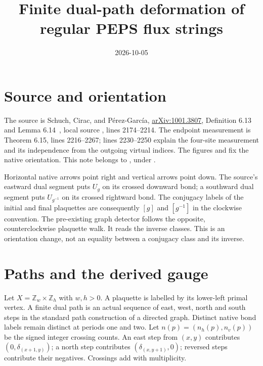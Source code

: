 \documentclass{article}
\title{Finite dual-path deformation of regular PEPS flux strings}
\author{}
\date{2026-10-05}
\begin{document}
\maketitle
{}

\section{Source and orientation}
The source is Schuch, Cirac, and P\'erez-Garc\'ia,
\href{https://arxiv.org/abs/1001.3807}{arXiv:1001.3807},
Definition 6.13 and Lemma 6.14~\cite{Schuch2010PEPS}, local source
, lines 2174--2214.
The endpoint measurement is Theorem 6.15, lines 2216--2267;
lines 2230--2250 explain the four-site measurement and its independence
from the outgoing virtual indices. The figures
 and
 fix the native orientation.
This note belongs to , under .

Horizontal native arrows point right and vertical arrows point down.
The source's eastward dual segment puts $U_g$ on its crossed downward
bond; a southward dual segment puts $U_{g^{-1}}$ on its crossed
rightward bond. The conjugacy labels of the initial and final plaquettes
are consequently $[g]$ and $[g^{-1}]$ in the clockwise convention.
The pre-existing graph detector follows the opposite, counterclockwise
plaquette walk. It reads the inverse classes. This is an orientation
change, not an equality between a conjugacy class and its inverse.

\section{Paths and the derived gauge}
Let $X=\mathbb Z_w\times\mathbb Z_h$ with $w,h>0$.
A plaquette is labelled by its lower-left primal vertex.
A finite dual path is an actual sequence of east, west, north and south
steps in the standard path construction of a directed graph. Distinct
native bond labels remain distinct at periods one and two. Let
$n(p)=(n_h(p),n_v(p))$ be the signed integer crossing counts.
An east step from $(x,y)$ contributes $(0,\delta_{(x+1,y)})$;
a north step contributes $(\delta_{(x,y+1)},0)$; reversed steps
contribute their negatives. Crossings add with multiplicity.
\end{document}
